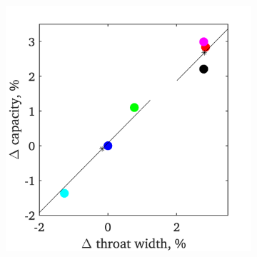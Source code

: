 \documentclass[a4paper, 11pt, oneside]{report}
\begin{document}
\begin{figure}[H]
	\centering
	\begin{subfigure}{.45\textwidth}
		\centering
		\includegraphics[width=\linewidth]{figs/T900_2d_capacities_vs_throat_widths.png}
	\end{subfigure}
	\begin{subfigure}{.1125\textwidth}
		\centering

\end{subfigure}
\end{figure}
\end{document}

